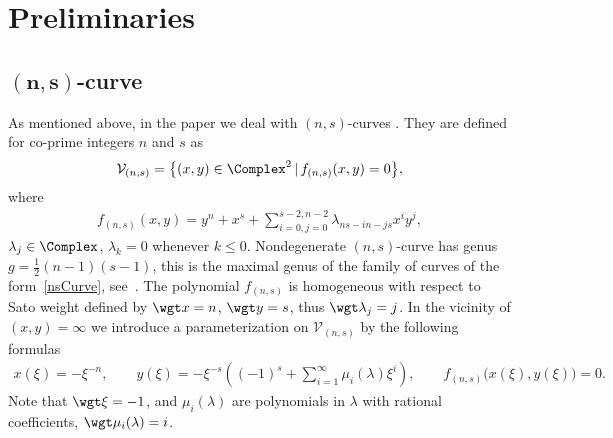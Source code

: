 \section{Preliminaries}\label{s:Prel}

\subsection[$(n,s)$-curve]{$\boldsymbol{(n,s)}$-curve}\label{ss:nsCurve}
As mentioned above, in the paper we deal with $(n,s)$-curves \cite{BEL1999}.
They are defined for co-prime integers $n$ and $s$
as \begin{gather*}\mathcal{V}_{(n,s)}=\big\{(x,y)\in \Complex^2 \,|\, f_{(n,s)}(x,y) =0\big\},\end{gather*} where
\begin{gather}\label{nsCurve}
 f_{(n,s)}(x,y) = y^n + x^s + \sum_{i=0, j=0}^{s-2,n-2} \lambda_{ns-in- js} x^i y^j,
\end{gather}
$\lambda_{j}\in \Complex$, $\lambda_{k}=0$ whenever $k\leqslant 0$. Nondegenerate $(n,s)$-curve has genus $g = \frac{1}{2}(n - 1)(s - 1)$, {this is the maximal genus of the family of curves of the form~\eqref{nsCurve}}, see~\cite{BEL1999}. The polynomial $f_{(n,s)}$ is homogeneous with respect to Sato weight defined by $\wgt x = n$, $\wgt y=s$, thus $\wgt \lambda_j=j$. In the vicinity of $(x,y)=\infty$ we introduce a parameterization on $\mathcal{V}_{(n,s)}$ by the following formulas
\begin{gather*}%
x(\xi)=-\xi^{-n}, \qquad y(\xi)=-\xi^{-s}\left((-1)^s+ \sum_{i=1}^{\infty} \mu_i(\lambda) \xi^i\right), \qquad f_{(n,s)}\big(x(\xi),y(\xi)\big)=0.
\end{gather*}
Note that $\wgt \xi = -1$, and $\mu_i(\lambda)$ are polynomials in $\lambda$ with rational coefficients, $\wgt \mu_i(\lambda) = i$.

